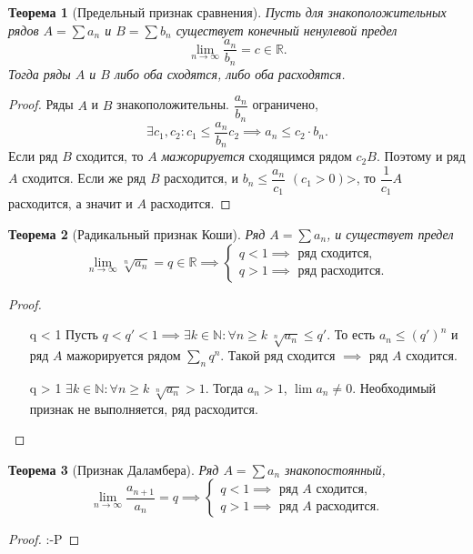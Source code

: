 \documentclass[12pt]{report}
\newtheorem{theorem}{Теорема}
\begin{document}
\begin{theorem}[Предельный признак сравнения]
Пусть для знакоположительных рядов $A = \sum a_n$ и $B = \sum b_n$ существует конечный ненулевой предел
\[ \lim_{n \to \infty} \frac{a_n}{b_n} = c \in \mathbb{R}.\]
Тогда ряды $A$ и $B$ либо оба сходятся, либо оба расходятся.
\end{theorem}
\begin{proof}
Ряды $A$ и $B$ знакоположительны. $\dfrac{a_n}{b_n}$ ограничено, 
\[\exists c_1, c_2 : c_1 \leqslant \frac{a_n}{b_n} c_2 \implies a_n \leqslant c_2 \cdot b_n.\]
Если ряд $B$ сходится, то $A$ \emph{мажорируется} сходящимся рядом $c_2 B$. Поэтому и ряд $A$ сходится. Если же ряд $B$ расходится, и $b_n \leqslant \dfrac{a_n}{c_1}$ $(c_1 > 0)$>, то $\dfrac{1}{c_1}A$ расходится, а значит и $A$ расходится.
\end{proof}

\begin{theorem}[Радикальный признак Коши]
Ряд $A = \sum a_n$, и существует предел 
\[\lim_{n \to \infty} \sqrt[n]{a_n} = q \in \mathbb{R} \implies
\begin{cases}
q < 1 \implies \text{ ряд сходится},\\
q > 1 \implies \text{ ряд расходится}.
\end{cases} \]
\end{theorem}
\begin{proof}
\begin{enumerate}
\item[] %
\item[q < 1] Пусть $q < q' < 1 \implies \exists k \in \mathbb{N} : \forall n \geqslant k ~ \sqrt[n]{a_n} \leqslant q'$. То есть $a_n \leqslant (q')^n$ и ряд $A$ мажорируется рядом $\sum\limits_n q^n$. Такой ряд сходится $\implies$ ряд $A$ сходится.
\item[q > 1] $\exists k \in \mathbb{N} : \forall n \geqslant k ~ \sqrt[n]{a_n} > 1$. Тогда $a_n > 1$, $\lim a_n \neq 0$. Необходимый признак не выполняется, ряд расходится.
\end{enumerate}
\end{proof}

\begin{theorem}[Признак Даламбера]
Ряд $A = \sum a_n$ знакопостоянный,
\[ \lim_{n \to \infty} \frac{a_{n+1}}{a_n} = q \implies
\begin{cases}
q < 1 \implies \text{ ряд $A$ сходится},\\
q > 1 \implies \text{ ряд $A$ расходится}.
\end{cases}\]

\end{theorem}
\begin{proof}
:-P
\end{proof}
\end{document}
